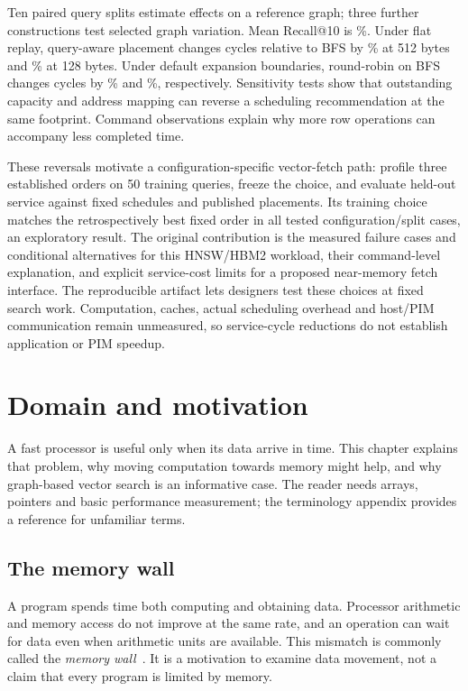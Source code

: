 \documentclass[11pt,a4paper]{report}
\begin{document}
Ten paired query splits estimate effects on a reference graph; three further constructions test selected graph variation. Mean Recall@10 is \SiftRecall\%. Under flat replay, query-aware placement changes cycles relative to BFS by \QADeltaFloat\% at 512 bytes and \QADeltaCompact\% at 128 bytes. Under default expansion boundaries, round-robin on BFS changes cycles by \RoundRobinBFSMeanFloat\% and \RoundRobinBFSMeanCompact\%, respectively. Sensitivity tests show that outstanding capacity and address mapping can reverse a scheduling recommendation at the same footprint. Command observations explain why more row operations can accompany less completed time.

These reversals motivate a configuration-specific vector-fetch path: profile three established orders on 50 training queries, freeze the choice, and evaluate held-out service against fixed schedules and published placements. Its training choice matches the retrospectively best fixed order in all \ProfileOracleMatches{} tested configuration/split cases, an exploratory result. The original contribution is the measured failure cases and conditional alternatives for this HNSW/HBM2 workload, their command-level explanation, and explicit service-cost limits for a proposed near-memory fetch interface. The reproducible artifact lets designers test these choices at fixed search work. Computation, caches, actual scheduling overhead and host/PIM communication remain unmeasured, so service-cycle reductions do not establish application or PIM speedup.
\tableofcontents
\listoffigures
\begingroup\small\setlength{\parskip}{0pt}
\listoftables
\endgroup
\clearpage{}

\chapter{Domain and motivation}
\label{ch:background}
A fast processor is useful only when its data arrive in time. This chapter explains that problem, why moving computation towards memory might help, and why graph-based vector search is an informative case. The reader needs arrays, pointers and basic performance measurement; the terminology appendix provides a reference for unfamiliar terms.

\section{The memory wall}
A program spends time both computing and obtaining data. Processor arithmetic and memory access do not improve at the same rate, and an operation can wait for data even when arithmetic units are available. This mismatch is commonly called the \emph{memory wall}~\cite{primer}. It is a motivation to examine data movement, not a claim that every program is limited by memory.
\end{document}
